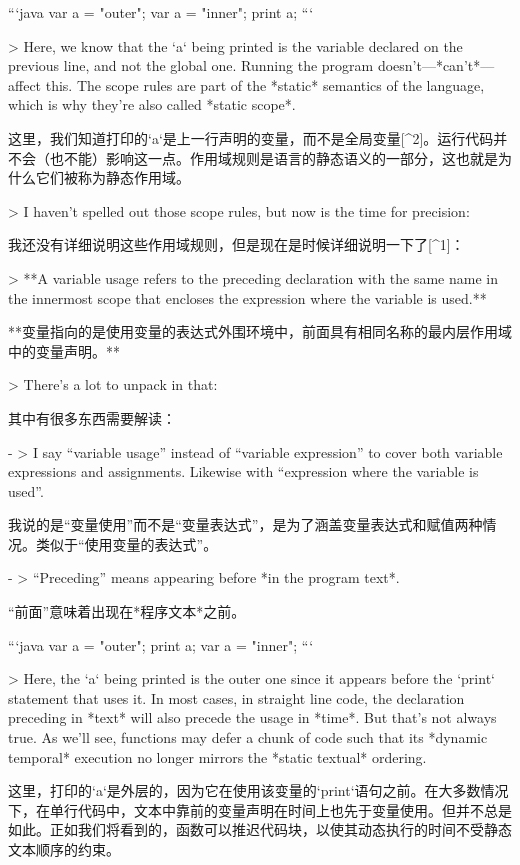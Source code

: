 \documentclass[cn,11pt,chinese]{elegantbook}
\begin{document}
{{{{{{{{{{{{```java
var a = "outer";
{
  var a = "inner";
  print a;
}
```

> Here, we know that the `a` being printed is the variable declared on the previous line, and not the global one. Running the program doesn’t—*can’t*—affect this. The scope rules are part of the *static* semantics of the language, which is why they’re also called *static scope*.

这里，我们知道打印的`a`是上一行声明的变量，而不是全局变量[^2]。运行代码并不会（也不能）影响这一点。作用域规则是语言的静态语义的一部分，这也就是为什么它们被称为静态作用域。

> I haven’t spelled out those scope rules, but now is the time for precision:

我还没有详细说明这些作用域规则，但是现在是时候详细说明一下了[^1]：

> **A variable usage refers to the preceding declaration with the same name in the innermost scope that encloses the expression where the variable is used.**

**变量指向的是使用变量的表达式外围环境中，前面具有相同名称的最内层作用域中的变量声明。**

> There’s a lot to unpack in that:

其中有很多东西需要解读：

- > I say “variable usage” instead of “variable expression” to cover both variable expressions and assignments. Likewise with “expression where the variable is used”.

  我说的是“变量使用”而不是“变量表达式”，是为了涵盖变量表达式和赋值两种情况。类似于“使用变量的表达式”。

- > “Preceding” means appearing before *in the program text*.

  “前面”意味着出现在*程序文本*之前。

  ```java
  var a = "outer";
  {
    print a;
    var a = "inner";
  }
  ```

  > Here, the `a` being printed is the outer one since it appears before the `print` statement that uses it. In most cases, in straight line code, the declaration preceding in *text* will also precede the usage in *time*. But that’s not always true. As we’ll see, functions may defer a chunk of code such that its *dynamic temporal* execution no longer mirrors the *static textual* ordering.

  这里，打印的`a`是外层的，因为它在使用该变量的`print`语句之前。在大多数情况下，在单行代码中，文本中靠前的变量声明在时间上也先于变量使用。但并不总是如此。正如我们将看到的，函数可以推迟代码块，以使其动态执行的时间不受静态文本顺序的约束。

}}}}}}}}}}}}
\end{document}
